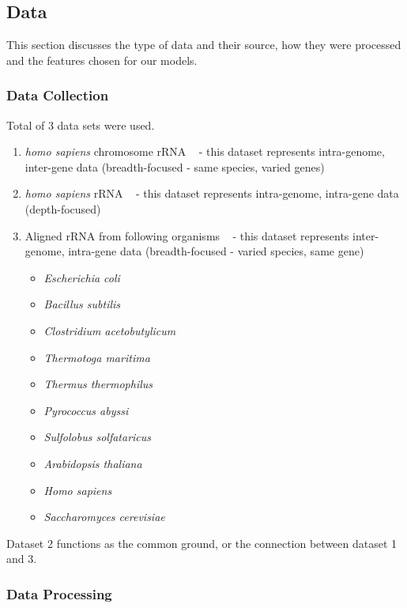 \documentclass[paper=a4, fontsize=11pt]{scrartcl}
\numberwithin{equation}{section}    %
\numberwithin{figure}{section}      %
\numberwithin{table}{section}       %
\numberwithin{equation}{section}    %
\numberwithin{figure}{section}      %
\numberwithin{table}{section}       %
\begin{document}
\subsection{Data}

This section discusses the type of data and their source, how they were processed and the features chosen for our models.

\subsubsection{Data Collection}

Total of 3 data sets were used. 

\begin{enumerate}
	\item \textit{homo sapiens} chromosome rRNA ~\cite{schwartz} - this dataset represents intra-genome, inter-gene data (breadth-focused - same species, varied genes)
	\item \textit{homo sapiens} rRNA ~\cite{carlile} - this dataset represents intra-genome, intra-gene data (depth-focused)
	\item Aligned rRNA from following organisms ~\cite{modomics} - this dataset represents inter-genome, intra-gene data (breadth-focused - varied species, same gene)
    	\begin{itemize}
        \item \textit{Escherichia coli}
        \item \textit{Bacillus subtilis}
        \item \textit{Clostridium acetobutylicum}
        \item \textit{Thermotoga maritima}
        \item \textit{Thermus thermophilus}
        \item \textit{Pyrococcus abyssi}
        \item \textit{Sulfolobus solfataricus}
        \item \textit{Arabidopsis thaliana}
        \item \textit{Homo sapiens}
        \item \textit{Saccharomyces cerevisiae}
        \end{itemize}
\end{enumerate}

Dataset 2 functions as the common ground, or the connection between dataset 1 and 3. 

\subsubsection{Data Processing}
\end{document}
